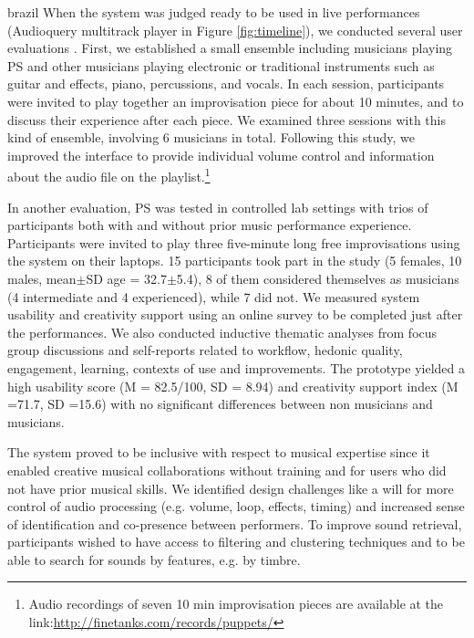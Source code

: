 \begin{otherlanguage*}{brazil}
When the system was judged ready to be used in live performances (Audioquery multitrack player in Figure \ref{fig:timeline}), we conducted several user evaluations \cite{Stolfi2018b}. First, we established a small ensemble including musicians playing PS and other musicians playing electronic or traditional instruments such as guitar and effects, piano, percussions, and vocals. In each session, participants were invited to play together an improvisation piece for about 10 minutes, and to discuss their experience after each piece. We examined three sessions with this kind of ensemble, involving 6 musicians in total. Following this study, we improved the interface to provide individual volume control and information about the audio file on the playlist.\footnote{Audio recordings of seven 10 min improvisation pieces are available at the link:\url{http://finetanks.com/records/puppets/}}

In another evaluation, PS was tested in controlled lab settings with trios of participants both with and without prior music performance experience. Participants were invited to play three five-minute long free improvisations using the system on their laptops. 15 participants took part in the study (5 females, 10 males, mean$\pm$SD age = 32.7$\pm$5.4), 8 of them considered themselves as musicians (4 intermediate and 4 experienced), while 7 did not. We measured system usability \cite{Jordan1996} and creativity support \cite{Cherry2014} using an online survey to be completed just after the performances. We also conducted inductive thematic analyses \cite{Braun2006} from focus group discussions and self-reports related to workflow, hedonic quality, engagement, learning, contexts of use and improvements. The prototype yielded a high usability score (M = 82.5/100, SD = 8.94) and creativity support index (M =71.7, SD =15.6) with no significant differences between non musicians and musicians.

The system proved to be inclusive with respect to musical expertise since it enabled creative musical collaborations without training and for users who did not have prior musical skills. We identified design challenges like a will for more control of audio processing (e.g. volume, loop, effects, timing) and increased sense of identification and co-presence between performers. To improve sound retrieval, participants wished to have access to filtering and clustering techniques and to be able to search for sounds by features, e.g. by timbre.


\end{otherlanguage*}
